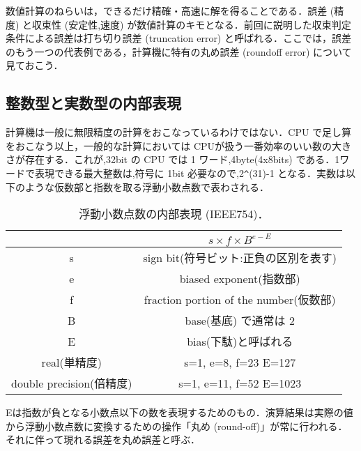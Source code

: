 数値計算のねらいは，できるだけ精確・高速に解を得ることである．誤差 (精度) と収束性 (安定性,速度)
が数値計算のキモとなる．前回に説明した収束判定条件による誤差は打ち切り誤差 (truncation error)
と呼ばれる．ここでは，誤差のもう一つの代表例である，計算機に特有の丸め誤差 (roundoff error) について見ておこう．

\subsection{整数型と実数型の内部表現}
計算機は一般に無限精度の計算をおこなっているわけではない．CPU で足し算をおこなう以上，一般的な計算においては CPUが扱う一番効率のいい数の大きさが存在する．これが,32bit の CPU では 1 ワード,4byte(4x8bits) である．1ワードで表現できる最大整数は,符号に 1bit 必要なので,2\verb|^|(31)-1 となる．実数は以下のような仮数部と指数を取る浮動小数点数で表わされる．

\begin{table}[htbp]
\caption{浮動小数点数の内部表現 (IEEE754)．}
\begin{center}
\begin{tabular}{c|c}
&$s \times f \times B ^{e-E}$ \\
\hline
s&sign bit(符号ビット:正負の区別を表す) \\
e&biased exponent(指数部) \\
f&fraction portion of the number(仮数部) \\\hline
B&base(基底) で通常は 2　\\
E&bias(下駄)と呼ばれる \\ \hline
real(単精度)&s=1, e=8, f=23 E=127 \\
double precision(倍精度)&s=1, e=11, f=52 E=1023
\end{tabular}
\end{center}
\label{default}
\end{table}%
Eは指数が負となる小数点以下の数を表現するためのもの．演算結果は実際の値から浮動小数点数に変換するための操作「丸め (round-off)」が常に行われる．それに伴って現れる誤差を丸め誤差と呼ぶ．

